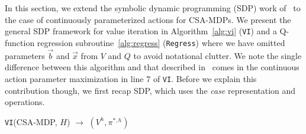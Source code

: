 \label{sec:sdp}

In this section, we extend the symbolic dynamic programming (SDP) work
of~\cite{sanner_uai11} to the case of continuously parameterized
actions for CSA-MDPs.  We present the general SDP framework for value
iteration in Algorithm~\ref{alg:vi} (\texttt{VI}) and a Q-function
regression subroutine~\ref{alg:regress} (\texttt{Regress}) where we
have omitted parameters $\vec{b}$ and $\vec{x}$ from $V$ and $Q$ to
avoid notational clutter.  We note the single difference between this
algorithm and that described in~\cite{sanner_uai11} comes in the
continuous action parameter maximization in line 7 of \texttt{VI}.
Before we explain this contribution though, we first recap SDP,
which uses the \emph{case} representation and operations.

\incmargin{.5em}
\linesnumbered
\begin{algorithm}[t!]
\vspace{-.5mm}
\dontprintsemicolon
{}
\caption{\footnotesize \texttt{VI}(CSA-MDP, $H$) $\longrightarrow$ $(V^h,\pi^{*,h})$ \label{alg:vi}}
\vspace{-1mm}
\end{algorithm}
\decmargin{.5em}

